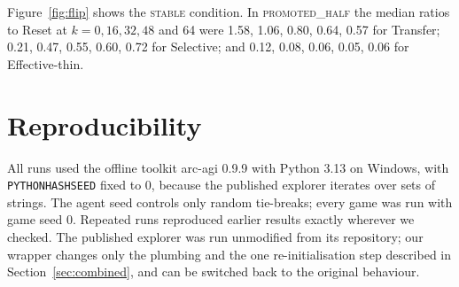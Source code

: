\documentclass[11pt,a4paper]{article}
\begin{document}
Figure~\ref{fig:flip} shows the \textsc{stable} condition. In \textsc{promoted\_half} the median ratios to Reset at $k = 0, 16, 32, 48$ and 64 were 1.58, 1.06, 0.80, 0.64, 0.57 for Transfer; 0.21, 0.47, 0.55, 0.60, 0.72 for Selective; and 0.12, 0.08, 0.06, 0.05, 0.06 for Effective-thin.

\section{Reproducibility}

All runs used the offline toolkit arc-agi 0.9.9 with Python 3.13 on Windows, with \texttt{PYTHONHASHSEED} fixed to 0, because the published explorer iterates over sets of strings. The agent seed controls only random tie-breaks; every game was run with game seed 0. Repeated runs reproduced earlier results exactly wherever we checked. The published explorer was run unmodified from its repository; our wrapper changes only the plumbing and the one re-initialisation step described in Section~\ref{sec:combined}, and can be switched back to the original behaviour.



\end{document}
